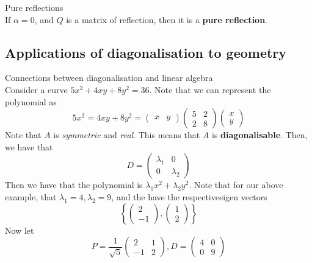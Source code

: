 \documentclass[journal, letterpaper]{IEEEtran}
\begin{document}
    \begin{mybox}{Pure reflections} \\
        If $\alpha = 0$, and $Q$ is a matrix of reflection, then it is a \textbf{pure reflection}.
    \end{mybox}
    \subsection{Applications of diagonalisation to geometry}
    \begin{mybox}{Connections between diagonalisation and linear algebra} \\ 
        Consider a curve $5x^2 + 4xy + 8y^2 = 36$. Note that we can represent the polynomial as
        $$ 5x^2 = 4xy + 8y^2 = \begin{pmatrix}
            x & y
        \end{pmatrix} \begin{pmatrix}
            5 & 2 \\ 2 & 8
        \end{pmatrix} \begin{pmatrix}
            x \\ y
        \end{pmatrix}$$
        Note that $A$ is \textit{symmetric} and \textit{real}. This means that $A$ is \textbf{diagonalisable}. Then, 
        we have that
        $$ D = \begin{pmatrix}
            \lambda_1 & 0 \\ 0 & \lambda_2
        \end{pmatrix}$$
        Then we have that the polynomial is $\lambda_1x^2 + \lambda_2y^2$. Note that for our above example,
        that $\lambda_1 = 4, \lambda_2 = 9$, and the have the respectiveeigen vectors
        $$
        \left\{ \begin{pmatrix}
        2 \\ -1
        \end{pmatrix}, \begin{pmatrix}
        1 \\ 2
        \end{pmatrix} \right\}
        $$
        Now let 
        $$ P = \frac{1}{\sqrt{5}}\begin{pmatrix}
            2 & 1 \\ -1 & 2
        \end{pmatrix}, D = \begin{pmatrix}
            4 & 0 \\ 0 & 9
        \end{pmatrix}$$

\end{mybox}
\end{document}

